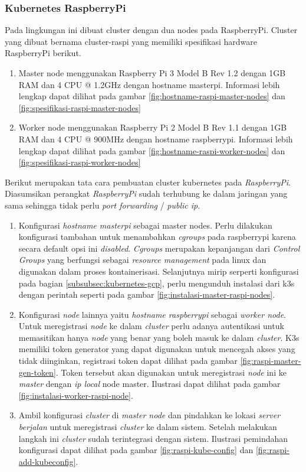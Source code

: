 \subsubsection{Kubernetes RaspberryPi}
Pada lingkungan ini dibuat cluster dengan dua nodes pada RaspberryPi. Cluster yang dibuat bernama cluster-raspi yang memiliki spesifikasi hardware RaspberryPi berikut.

\begin{enumerate}
  \item Master node menggunakan Raspberry Pi 3 Model B Rev 1.2 dengan 1GB RAM dan 4 CPU @ 1.2GHz dengan hostname masterpi. Informasi lebih lengkap dapat dilihat pada gambar \ref{fig:hostname-raspi-master-nodes} dan \ref{fig:spesifikasi-raspi-master-nodes}
  \item Worker node menggunakan Raspberry Pi 2 Model B Rev 1.1 dengan 1GB RAM dan 4 CPU @ 900MHz dengan hostname raspberrypi. Informasi lebih lengkap dapat dilihat pada gambar \ref{fig:hostname-raspi-worker-nodes} dan \ref{fig:spesifikasi-raspi-worker-nodes}
\end{enumerate}

Berikut merupakan tata cara pembuatan cluster kubernetes pada \textit{RaspberryPi}. Diasumsikan perangkat \textit{RaspberryPi} sudah terhubung ke dalam jaringan yang sama sehingga tidak perlu \textit{port forwarding} / \textit{public ip}.

\begin{enumerate}
  \item Konfigurasi \textit{hostname masterpi} sebagai master nodes. Perlu dilakukan konfigurasi tambahan untuk menambahkan \textit{cgroups} pada raspberrypi karena secara default opsi ini \textit{disabled}. \textit{Cgroups} merupakan kepanjangan dari \textit{Control Groups} yang berfungsi sebagai \textit{resource management} pada linux dan digunakan dalam proses kontainerisasi. Selanjutnya mirip serperti konfigurasi pada bagian \ref{subsubsec:kubernetes-gcp}, perlu mengunduh instalasi dari k3s dengan perintah seperti pada gambar \ref{fig:instalasi-master-raspi-nodes}.
  \item Konfigurasi \textit{node} lainnya yaitu \textit{hostname raspberrypi} sebagai \textit{worker node}. Untuk meregistrasi \textit{node} ke dalam \textit{cluster} perlu adanya autentikasi untuk memasitikan hanya \textit{node} yang benar yang boleh masuk ke dalam \textit{cluster}. K3s memiliki token generator yang dapat digunakan untuk mencegah akses yang tidak diinginkan, registrasi token dapat dilihat pada gambar \ref{fig:raspi-master-gen-token}. Token tersebut akan digunakan untuk meregistrasi \textit{node} ini ke \textit{master} dengan \textit{ip local} node master. Ilustrasi dapat dilihat pada gambar \ref{fig:instalasi-worker-raspi-node}.
  \item Ambil konfigurasi \textit{cluster} di \textit{master node} dan pindahkan ke lokasi \textit{server berjalan} untuk meregistrasi \textit{cluster} ke dalam sistem. Setelah melakukan langkah ini \textit{cluster} sudah terintegrasi dengan sistem. Ilustrasi pemindahan konfigurasi dapat dilihat pada gambar \ref{fig:raspi-kube-config} dan \ref{fig:raspi-add-kubeconfig}.
\end{enumerate}